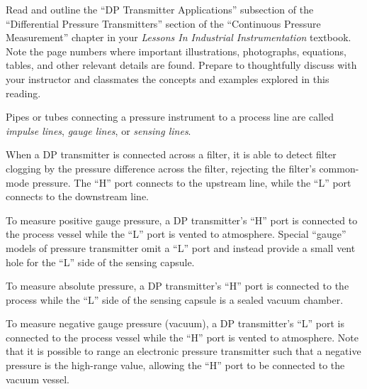 

Read and outline the ``DP Transmitter Applications'' subsection of the ``Differential Pressure Transmitters'' section of the ``Continuous Pressure Measurement'' chapter in your {\it Lessons In Industrial Instrumentation} textbook.  Note the page numbers where important illustrations, photographs, equations, tables, and other relevant details are found.  Prepare to thoughtfully discuss with your instructor and classmates the concepts and examples explored in this reading.














Pipes or tubes connecting a pressure instrument to a process line are called {\it impulse lines}, {\it gauge lines}, or {\it sensing lines}.

\vskip 10pt

When a DP transmitter is connected across a filter, it is able to detect filter clogging by the pressure difference across the filter, rejecting the filter's common-mode pressure.  The ``H'' port connects to the upstream line, while the ``L'' port connects to the downstream line.

\vskip 10pt

To measure positive gauge pressure, a DP transmitter's ``H'' port is connected to the process vessel while the ``L'' port is vented to atmosphere.  Special ``gauge'' models of pressure transmitter omit a ``L'' port and instead provide a small vent hole for the ``L'' side of the sensing capsule.

\vskip 10pt

To measure absolute pressure, a DP transmitter's ``H'' port is connected to the process while the ``L'' side of the sensing capsule is a sealed vacuum chamber.

\vskip 10pt

To measure negative gauge pressure (vacuum), a DP transmitter's ``L'' port is connected to the process vessel while the ``H'' port is vented to atmosphere.  Note that it is possible to range an electronic pressure transmitter such that a negative pressure is the high-range value, allowing the ``H'' port to be connected to the vacuum vessel.

